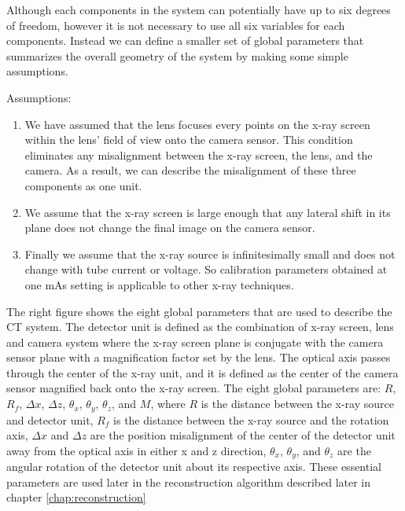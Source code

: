 Although each components in the system can potentially have up to six degrees of freedom, however it is not necessary to use all six variables for each components.  Instead we can define a smaller set of global parameters that summarizes the overall geometry of the system by making some simple assumptions.

Assumptions:

\begin{enumerate}
\item We have assumed that the lens focuses every points on the x-ray screen within the lens' field of view onto the camera sensor.  This condition eliminates any misalignment between the x-ray screen, the lens, and the camera.  As a result, we can describe the misalignment of these three components as one unit.

\item We assume that the x-ray screen is large enough that any lateral shift in its plane does not change the final image on the camera sensor.

\item Finally we assume that the x-ray source is infinitesimally small and does not change with tube current or voltage.  So calibration parameters obtained at one mAs setting is applicable to other x-ray techniques.
\end{enumerate}

The right figure shows the eight global parameters that are used to describe the CT system.  The detector unit is defined as the combination of x-ray screen, lens and camera system where the x-ray screen plane is conjugate with the camera sensor plane with a magnification factor set by the lens.  The optical axis passes through the center of the x-ray unit, and it is defined as the center of the camera sensor magnified back onto the x-ray screen.  The eight global parameters are: $R$, $R_f$, $\Delta x$, $\Delta z$, $\theta_x$, $\theta_y$, $\theta_z$, and $M$, where $R$ is the distance between the x-ray source and detector unit, $R_f$ is the distance between the x-ray source and the rotation axis, $\Delta x$ and $\Delta z$ are the position misalignment of the center of the detector unit away from the optical axis in either x and z direction, $\theta_x$, $\theta_y$, and $\theta_z$ are the angular rotation of the detector unit about its respective axis.  These essential parameters are used later in the reconstruction algorithm described later in chapter \ref{chap:reconstruction}

